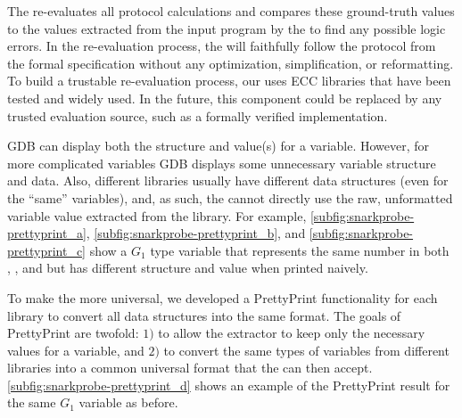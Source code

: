 The  re-evaluates all protocol calculations and compares these ground-truth values to the values extracted from the input program by the  to find any possible logic errors.
In the re-evaluation process, the  will faithfully follow the protocol from the formal specification without any optimization, simplification, or reformatting.  To build a trustable re-evaluation process, our  uses ECC libraries that have been tested and widely used.  In the future, this component could be replaced by any trusted evaluation source, such as a formally verified implementation.


%

%
GDB can display both the structure and value(s) for a variable. However, for more complicated variables 
GDB displays some unnecessary variable structure and data. Also, different libraries usually have different data structures (even for the ``same'' variables), and, as such, the  cannot directly use the raw, unformatted variable value extracted from the library. For example, \autoref{subfig:snarkprobe-prettyprint_a}, \autoref{subfig:snarkprobe-prettyprint_b}, and \autoref{subfig:snarkprobe-prettyprint_c} show a $G_1$ type variable that represents the same number in both \libsnark, \bellman, and \arkworks but has different structure and value when printed naively.

To make the  more universal, we developed a PrettyPrint functionality for each library to convert all data structures into the same format. The goals of PrettyPrint are twofold: $1)$ to allow the extractor to keep only the necessary values for a variable, and $2)$ to convert the same types of variables from different libraries into a common universal format that the  can then accept. \autoref{subfig:snarkprobe-prettyprint_d} shows an example of the PrettyPrint result for the same $G_1$ variable as before. %


